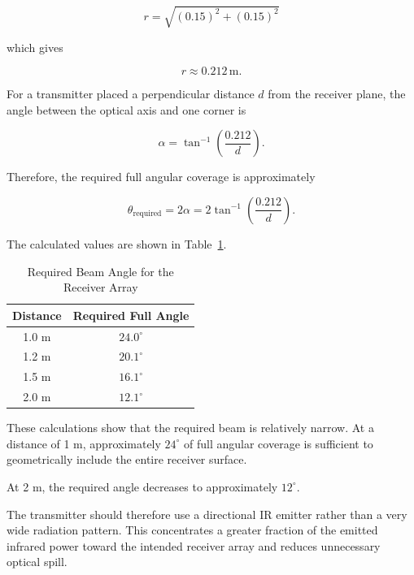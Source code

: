 \documentclass[a4paper,12pt]{article}
\begin{document}
\[
r =
\sqrt{
(0.15)^2 + (0.15)^2
}
\]

which gives

\[
r \approx 0.212\,\text{m}.
\]

For a transmitter placed a perpendicular distance \(d\) from the
receiver plane, the angle between the optical axis and one corner is

\[
\alpha
=
\tan^{-1}
\left(
\frac{0.212}{d}
\right).
\]

Therefore, the required full angular coverage is approximately

\[
\theta_{\text{required}}
=
2\alpha
=
2\tan^{-1}
\left(
\frac{0.212}{d}
\right).
\]

The calculated values are shown in
Table~\ref{tab:beam_requirement}.

\begin{table}[H]
    \centering
    \caption{Required Beam Angle for the Receiver Array}
    \label{tab:beam_requirement}

    \begin{tabular}{@{}cc@{}}
        \toprule

        \textbf{Distance} &
        \textbf{Required Full Angle} \\

        \midrule

        1.0 m &
        \(24.0^\circ\) \\

        1.2 m &
        \(20.1^\circ\) \\

        1.5 m &
        \(16.1^\circ\) \\

        2.0 m &
        \(12.1^\circ\) \\

        \bottomrule
    \end{tabular}

\end{table}

These calculations show that the required beam is relatively narrow.
At a distance of 1 m, approximately \(24^\circ\) of full angular
coverage is sufficient to geometrically include the entire receiver
surface.

At 2 m, the required angle decreases to approximately \(12^\circ\).

The transmitter should therefore use a directional IR emitter rather
than a very wide radiation pattern. This concentrates a greater
fraction of the emitted infrared power toward the intended receiver
array and reduces unnecessary optical spill.
\end{document}
